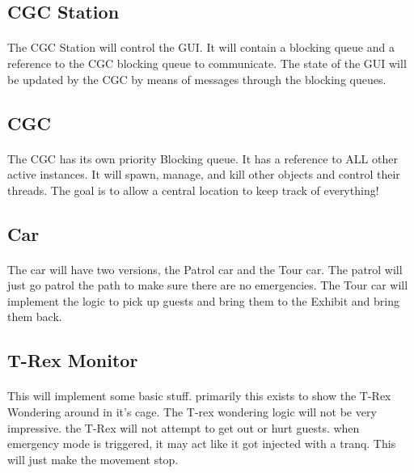 \documentclass[12pt]{article}
\begin{document}
\subsection{CGC Station}
\paragraph{} The CGC Station will control the GUI. It will contain a blocking queue and a reference to the CGC blocking queue to communicate. The state of the GUI
will be updated by the CGC by means of messages through the blocking queues.

\subsection{CGC}
\paragraph{} The CGC has its own priority Blocking queue. It has a reference to ALL other active 
instances. It will spawn, manage, and kill other objects and control their threads. 
The goal is to allow a central location to keep track of everything!

\subsection{Car}
\paragraph{} The car will have two versions, the Patrol car and the Tour car. 
The patrol will just go patrol the path to make sure there are no emergencies. The Tour car will implement the logic to pick 
up guests and bring them to the Exhibit and bring them back.

\subsection{T-Rex Monitor}
\paragraph{} This will implement some basic stuff. primarily this exists to show the T-Rex Wondering around in it's cage. 
The T-rex wondering logic will not be very impressive. the T-Rex will not attempt to get out or 
hurt guests. when emergency mode is triggered, 
it may act like it got injected with a tranq. This will just make the movement stop.
\end{document}
